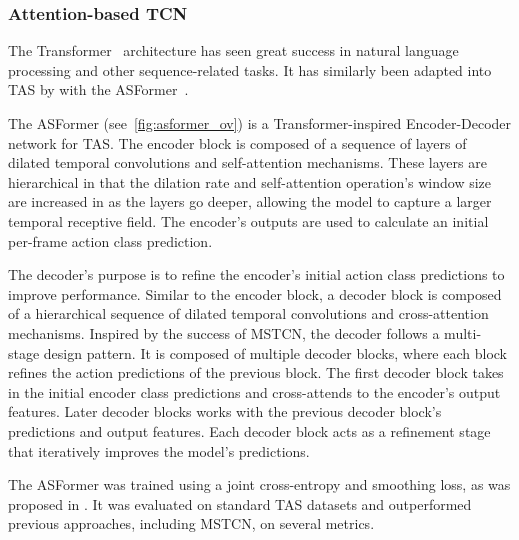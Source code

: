 
\subsubsection{Attention-based TCN}



The Transformer~\cite{vaswani2017attention} architecture has seen great success in natural language processing and other sequence-related tasks. It has similarly been adapted into TAS by \citeauthor{yi2021asformer} with the ASFormer~\cite{yi2021asformer}.

The ASFormer (see~\cref{fig:asformer_ov}) is a Transformer-inspired Encoder-Decoder network for TAS. The encoder block is composed of a sequence of layers of dilated temporal convolutions and self-attention mechanisms. These layers are hierarchical in that the dilation rate and self-attention operation's window size are increased in as the layers go deeper, allowing the model to capture a larger temporal receptive field. The encoder's outputs are used to calculate an initial per-frame action class prediction. 

The decoder's purpose is to refine the encoder's initial action class predictions to improve performance. Similar to the encoder block, a decoder block is composed of a hierarchical sequence of dilated temporal convolutions and cross-attention mechanisms. Inspired by the success of MSTCN, the decoder follows a multi-stage design pattern. It is composed of multiple decoder blocks, where each block refines the action predictions of the previous block. The first decoder block takes in the initial encoder class predictions and cross-attends to the encoder's output features. Later decoder blocks works with the previous decoder block's predictions and output features. Each decoder block acts as a refinement stage that iteratively improves the model's predictions.

The ASFormer was trained using a joint cross-entropy and smoothing loss, as was proposed in \cite{farha2019ms}. It was evaluated on standard TAS datasets and outperformed previous approaches, including MSTCN, on several metrics.


